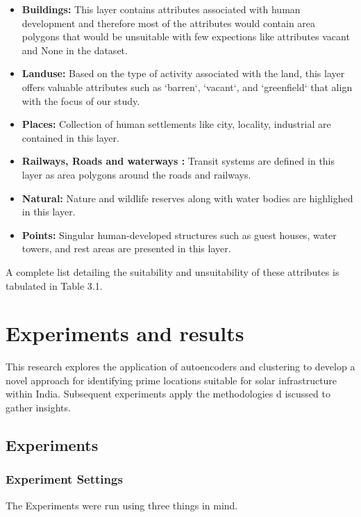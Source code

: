 \documentclass[a4paper,12pt]{Classes/RoboticsLaTeX}
\begin{document}
	\begin{itemize}
		\item \textbf{Buildings: } This layer contains attributes associated with human development and therefore most of the attributes would contain area polygons that would be unsuitable with few expections 
		like attributes vacant and None in the dataset.
		\item \textbf{Landuse: } Based on the type of activity associated with the land, this layer offers valuable attributes such as `barren`, `vacant`, and `greenfield` that align with the focus of our study.
		\item \textbf{Places: } Collection of human settlements like city, locality, industrial are contained in this layer.
		\item \textbf{Railways, Roads and waterways : } Transit systems are defined in this layer as area polygons around the roads and railways.
		\item \textbf{Natural: } Nature and wildlife reserves along with water bodies are highlighed in this layer.
		\item \textbf{Points: } Singular human-developed structures such as guest houses, water towers, and rest areas are presented in this layer.
	\end{itemize}

	A complete list detailing the suitability and unsuitability of these attributes is tabulated in Table 3.1.

	
	\chapter{Experiments and results}

	This research explores the application of autoencoders and clustering to develop a novel approach for identifying 
	prime locations suitable for solar infrastructure within India. Subsequent experiments apply the methodologies d
	iscussed to gather insights. 

	\section{Experiments}

	\subsection{Experiment Settings}

	The Experiments were run using three things in mind.
\end{document}
